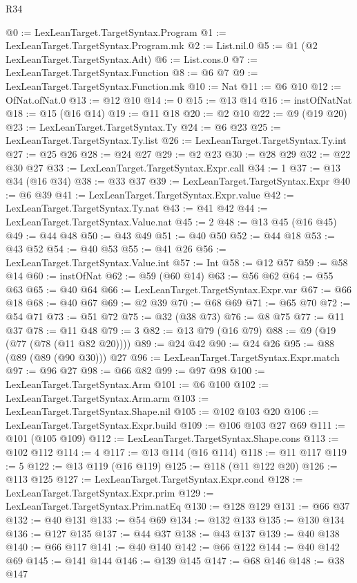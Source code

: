 \begin{lexlean}{R34}
\begin{coremodule}
@0 := LexLeanTarget.TargetSyntax.Program
@1 := LexLeanTarget.TargetSyntax.Program.mk
@2 := List.nil.{0}
@5 := @1 (@2 LexLeanTarget.TargetSyntax.Adt)
@6 := List.cons.{0}
@7 := LexLeanTarget.TargetSyntax.Function
@8 := @6 @7
@9 := LexLeanTarget.TargetSyntax.Function.mk
@10 := Nat
@11 := @6 @10
@12 := OfNat.ofNat.{0}
@13 := @12 @10
@14 := 0
@15 := @13 @14
@16 := instOfNatNat
@18 := @15 (@16 @14)
@19 := @11 @18
@20 := @2 @10
@22 := @9 (@19 @20)
@23 := LexLeanTarget.TargetSyntax.Ty
@24 := @6 @23
@25 := LexLeanTarget.TargetSyntax.Ty.list
@26 := LexLeanTarget.TargetSyntax.Ty.int
@27 := @25 @26
@28 := @24 @27
@29 := @2 @23
@30 := @28 @29
@32 := @22 @30 @27
@33 := LexLeanTarget.TargetSyntax.Expr.call
@34 := 1
@37 := @13 @34 (@16 @34)
@38 := @33 @37
@39 := LexLeanTarget.TargetSyntax.Expr
@40 := @6 @39
@41 := LexLeanTarget.TargetSyntax.Expr.value
@42 := LexLeanTarget.TargetSyntax.Ty.nat
@43 := @41 @42
@44 := LexLeanTarget.TargetSyntax.Value.nat
@45 := 2
@48 := @13 @45 (@16 @45)
@49 := @44 @48
@50 := @43 @49
@51 := @40 @50
@52 := @44 @18
@53 := @43 @52
@54 := @40 @53
@55 := @41 @26
@56 := LexLeanTarget.TargetSyntax.Value.int
@57 := Int
@58 := @12 @57
@59 := @58 @14
@60 := instOfNat
@62 := @59 (@60 @14)
@63 := @56 @62
@64 := @55 @63
@65 := @40 @64
@66 := LexLeanTarget.TargetSyntax.Expr.var
@67 := @66 @18
@68 := @40 @67
@69 := @2 @39
@70 := @68 @69
@71 := @65 @70
@72 := @54 @71
@73 := @51 @72
@75 := @32 (@38 @73)
@76 := @8 @75
@77 := @11 @37
@78 := @11 @48
@79 := 3
@82 := @13 @79 (@16 @79)
@88 := @9 (@19 (@77 (@78 (@11 @82 @20))))
@89 := @24 @42
@90 := @24 @26
@95 := @88 (@89 (@89 (@90 @30))) @27
@96 := LexLeanTarget.TargetSyntax.Expr.match
@97 := @96 @27
@98 := @66 @82
@99 := @97 @98
@100 := LexLeanTarget.TargetSyntax.Arm
@101 := @6 @100
@102 := LexLeanTarget.TargetSyntax.Arm.arm
@103 := LexLeanTarget.TargetSyntax.Shape.nil
@105 := @102 @103 @20
@106 := LexLeanTarget.TargetSyntax.Expr.build
@109 := @106 @103 @27 @69
@111 := @101 (@105 @109)
@112 := LexLeanTarget.TargetSyntax.Shape.cons
@113 := @102 @112
@114 := 4
@117 := @13 @114 (@16 @114)
@118 := @11 @117
@119 := 5
@122 := @13 @119 (@16 @119)
@125 := @118 (@11 @122 @20)
@126 := @113 @125
@127 := LexLeanTarget.TargetSyntax.Expr.cond
@128 := LexLeanTarget.TargetSyntax.Expr.prim
@129 := LexLeanTarget.TargetSyntax.Prim.natEq
@130 := @128 @129
@131 := @66 @37
@132 := @40 @131
@133 := @54 @69
@134 := @132 @133
@135 := @130 @134
@136 := @127 @135
@137 := @44 @37
@138 := @43 @137
@139 := @40 @138
@140 := @66 @117
@141 := @40 @140
@142 := @66 @122
@144 := @40 @142 @69
@145 := @141 @144
@146 := @139 @145
@147 := @68 @146
@148 := @38 @147

\end{coremodule}
\end{lexlean}
